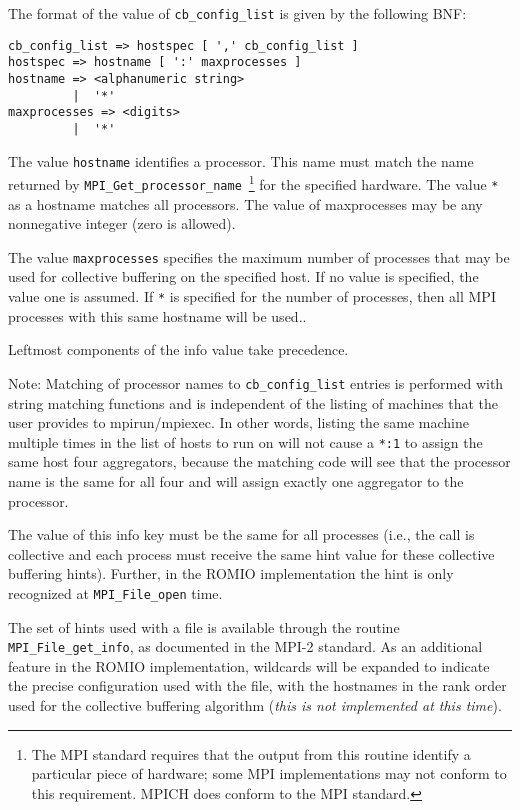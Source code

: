 The format of the value of \texttt{cb\_config\_list} is given by the
following BNF:
\begin{verbatim}
cb_config_list => hostspec [ ',' cb_config_list ]
hostspec => hostname [ ':' maxprocesses ]
hostname => <alphanumeric string>
         |  '*' 
maxprocesses => <digits>
         |  '*'
\end{verbatim}

The value \texttt{hostname} identifies a processor. This name must match
the name returned by \texttt{MPI\_Get\_processor\_name}~\footnote{The
MPI standard requires that the output from this routine identify a
particular piece of hardware; some MPI implementations may not conform
to this requirement. MPICH does conform to the MPI standard.}
%
for the specified hardware. The value \texttt{*} as a hostname matches all
processors. The value of maxprocesses may be any nonnegative integer
(zero is allowed).

The value \texttt{maxprocesses} specifies the maximum number of
processes that may be used for collective buffering on the specified
host. If no value is specified, the value one is assumed. If \texttt{*}
is specified for the number of processes, then all MPI processes with
this same hostname will be used..

Leftmost components of the info value take precedence.

Note: Matching of processor names to \texttt{cb\_config\_list} entries
is performed with string matching functions and is independent of the
listing of machines that the user provides to mpirun/mpiexec.  In other
words, listing the same machine multiple times in the list of hosts to
run on will not cause a \texttt{*:1} to assign the same host four
aggregators, because the matching code will see that the processor name
is the same for all four and will assign exactly one aggregator to the
processor.

The value of this info key must be the same for all processes (i.e., the
call is collective and each process must receive the same hint value for
these collective buffering hints).  Further, in the ROMIO implementation
the hint is only recognized at \texttt{MPI\_File\_open} time.

The set of hints used with a file is available through the routine
\texttt{MPI\_File\_get\_info}, as documented in the MPI-2 standard. 
As an additional feature in the ROMIO implementation, wildcards will
be expanded to indicate the precise configuration used with the file,
with the hostnames in the rank order used for the collective buffering
algorithm (\emph{this is not implemented at this time}).

